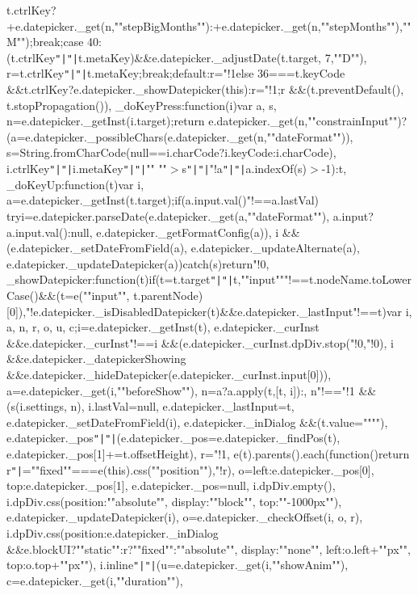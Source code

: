 t.\+ctrl\+Key?+e.\+datepicker.\+\_\+get(n,""step\+Big\+Months"")\+:+e.\+datepicker.\+\_\+get(n,""step\+Months""),""M"");break;case 40\+:(t.\+ctrl\+Key\texttt{"|}\texttt{"|}t.\+meta\+Key)\&\&e.\+datepicker.\+\_\+adjust\+Date(t.\+target, 7,""D""), r=t.\+ctrl\+Key\texttt{"|}\texttt{"|}t.\+meta\+Key;break;default\+:r="!1\rcurly{}else 36===t.\+key\+Code \&\&t.\+ctrl\+Key?e.\+datepicker.\+\_\+show\+Datepicker(this)\+:r="!1;r \&\&(t.\+prevent\+Default(), t.\+stop\+Propagation())\rcurly{}, \+\_\+do\+Key\+Press\+:function(i)\lcurly{}var a, s, n=e.\+datepicker.\+\_\+get\+Inst(i.\+target);return e.\+datepicker.\+\_\+get(n,""constrain\+Input"")?(a=e.\+datepicker.\+\_\+possible\+Chars(e.\+datepicker.\+\_\+get(n,""date\+Format"")), s=\+String.\+from\+Char\+Code(null==i.\+char\+Code?i.\+key\+Code\+:i.\+char\+Code), i.\+ctrl\+Key\texttt{"|}\texttt{"|}i.\+meta\+Key\texttt{"|}\texttt{"|}"" ""$>$s\texttt{"|}\texttt{"|}"!a\texttt{"|}\texttt{"|}a.\+index\+Of(s)$>$-\/1)\+:t\rcurly{}, \+\_\+do\+Key\+Up\+:function(t)\lcurly{}var i, a=e.\+datepicker.\+\_\+get\+Inst(t.\+target);if(a.\+input.\+val()"!==a.\+last\+Val) try\lcurly{}i=e.\+datepicker.\+parse\+Date(e.\+datepicker.\+\_\+get(a,""date\+Format""), a.\+input?a.\+input.\+val()\+:null, e.\+datepicker.\+\_\+get\+Format\+Config(a)), i \&\&(e.\+datepicker.\+\_\+set\+Date\+From\+Field(a), e.\+datepicker.\+\_\+update\+Alternate(a), e.\+datepicker.\+\_\+update\+Datepicker(a))\rcurly{}catch(s)\lcurly{}\rcurly{}return"!0\rcurly{}, \+\_\+show\+Datepicker\+:function(t)\lcurly{}if(t=t.\+target\texttt{"|}\texttt{"|}t,""input"""!==t.\+node\+Name.\+to\+Lower\+Case()\&\&(t=e(""input"", t.\+parent\+Node)[0]),"!e.\+datepicker.\+\_\+is\+Disabled\+Datepicker(t)\&\&e.\+datepicker.\+\_\+last\+Input"!==t)\lcurly{}var i, a, n, r, o, u, c;i=e.\+datepicker.\+\_\+get\+Inst(t), e.\+datepicker.\+\_\+cur\+Inst \&\&e.\+datepicker.\+\_\+cur\+Inst"!==i \&\&(e.\+datepicker.\+\_\+cur\+Inst.\+dp\+Div.\+stop("!0,"!0), i \&\&e.\+datepicker.\+\_\+datepicker\+Showing \&\&e.\+datepicker.\+\_\+hide\+Datepicker(e.\+datepicker.\+\_\+cur\+Inst.\+input[0])), a=e.\+datepicker.\+\_\+get(i,""before\+Show""), n=a?a.\+apply(t,[t, i])\+:\lcurly{}\rcurly{}, n"!=="!1 \&\&(s(i.\+settings, n), i.\+last\+Val=null, e.\+datepicker.\+\_\+last\+Input=t, e.\+datepicker.\+\_\+set\+Date\+From\+Field(i), e.\+datepicker.\+\_\+in\+Dialog \&\&(t.\+value=""""), e.\+datepicker.\+\_\+pos\texttt{"|}\texttt{"|}(e.\+datepicker.\+\_\+pos=e.\+datepicker.\+\_\+find\+Pos(t), e.\+datepicker.\+\_\+pos[1]+=t.\+offset\+Height), r="!1, e(t).\+parents().\+each(function()\lcurly{}return r\texttt{"|}=""fixed""===e(this).\+css(""position""),"!r\rcurly{}), o=\lcurly{}left\+:e.\+datepicker.\+\_\+pos[0], top\+:e.\+datepicker.\+\_\+pos[1]\rcurly{}, e.\+datepicker.\+\_\+pos=null, i.\+dp\+Div.\+empty(), i.\+dp\+Div.\+css(\lcurly{}position\+:""absolute"", display\+:""block"", top\+:""-\/1000px""\rcurly{}), e.\+datepicker.\+\_\+update\+Datepicker(i), o=e.\+datepicker.\+\_\+check\+Offset(i, o, r), i.\+dp\+Div.\+css(\lcurly{}position\+:e.\+datepicker.\+\_\+in\+Dialog \&\&e.\+block\+U\+I?""static""\+:r?""fixed""\+:""absolute"", display\+:""none"", left\+:o.\+left+""px"", top\+:o.\+top+""px""\rcurly{}), i.\+inline\texttt{"|}\texttt{"|}(u=e.\+datepicker.\+\_\+get(i,""show\+Anim""), c=e.\+datepicker.\+\_\+get(i,""duration""), 